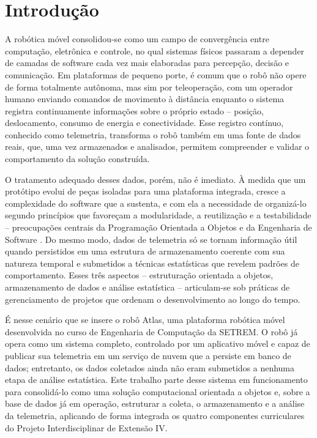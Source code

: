 \chapter*[Introdução]{Introdução}\label{chap:intro}

A robótica móvel consolidou-se como um campo de convergência entre computação, eletrônica e controle, no qual sistemas físicos passaram a depender de camadas de software cada vez mais elaboradas para percepção, decisão e comunicação. Em plataformas de pequeno porte, é comum que o robô não opere de forma totalmente autônoma, mas sim por teleoperação, com um operador humano enviando comandos de movimento à distância enquanto o sistema registra continuamente informações sobre o próprio estado -- posição, deslocamento, consumo de energia e conectividade. Esse registro contínuo, conhecido como telemetria, transforma o robô também em uma fonte de dados reais, que, uma vez armazenados e analisados, permitem compreender e validar o comportamento da solução construída.

O tratamento adequado desses dados, porém, não é imediato. À medida que um protótipo evolui de peças isoladas para uma plataforma integrada, cresce a complexidade do software que a sustenta, e com ela a necessidade de organizá-lo segundo princípios que favoreçam a modularidade, a reutilização e a testabilidade -- preocupações centrais da Programação Orientada a Objetos e da Engenharia de Software \cite{sommerville2018}. Do mesmo modo, dados de telemetria só se tornam informação útil quando persistidos em uma estrutura de armazenamento coerente com sua natureza temporal e submetidos a técnicas estatísticas que revelem padrões de comportamento. Esses três aspectos -- estruturação orientada a objetos, armazenamento de dados e análise estatística -- articulam-se sob práticas de gerenciamento de projetos que ordenam o desenvolvimento ao longo do tempo.

É nesse cenário que se insere o robô Atlas, uma plataforma robótica móvel desenvolvida no curso de Engenharia de Computação da SETREM. O robô já opera como um sistema completo, controlado por um aplicativo móvel e capaz de publicar sua telemetria em um serviço de nuvem que a persiste em banco de dados; entretanto, os dados coletados ainda não eram submetidos a nenhuma etapa de análise estatística. Este trabalho parte desse sistema em funcionamento para consolidá-lo como uma solução computacional orientada a objetos e, sobre a base de dados já em operação, estruturar a coleta, o armazenamento e a análise da telemetria, aplicando de forma integrada os quatro componentes curriculares do Projeto Interdisciplinar de Extensão IV.

